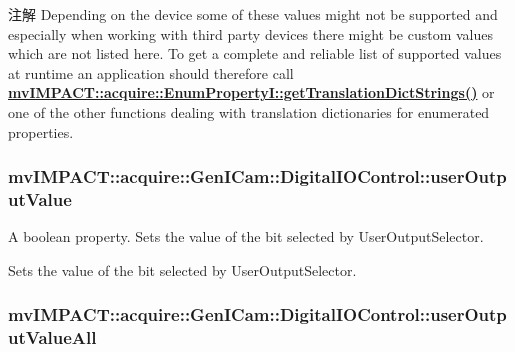 \begin{DoxyNote}{注解}
Depending on the device some of these values might not be supported and especially when working with third party devices there might be custom values which are not listed here. To get a complete and reliable list of supported values at runtime an application should therefore call {\bfseries \hyperlink{classmv_i_m_p_a_c_t_1_1acquire_1_1_enum_property_i_a0ba6ccbf5ee69784d5d0b537924d26b6}{mv\+I\+M\+P\+A\+C\+T\+::acquire\+::\+Enum\+Property\+I\+::get\+Translation\+Dict\+Strings()}} or one of the other functions dealing with translation dictionaries for enumerated properties. 
\end{DoxyNote}
\hypertarget{classmv_i_m_p_a_c_t_1_1acquire_1_1_gen_i_cam_1_1_digital_i_o_control_a061e414fc5254821a2bd512ae7c7e4af}{
\subsubsection[{user\+Output\+Value}]{ mv\+I\+M\+P\+A\+C\+T\+::acquire\+::\+Gen\+I\+Cam\+::\+Digital\+I\+O\+Control\+::user\+Output\+Value}}\label{classmv_i_m_p_a_c_t_1_1acquire_1_1_gen_i_cam_1_1_digital_i_o_control_a061e414fc5254821a2bd512ae7c7e4af}


A boolean property. Sets the value of the bit selected by User\+Output\+Selector. 

Sets the value of the bit selected by User\+Output\+Selector. \hypertarget{classmv_i_m_p_a_c_t_1_1acquire_1_1_gen_i_cam_1_1_digital_i_o_control_a2b61661cdb50161e17bb472614610506}{
\subsubsection[{user\+Output\+Value\+All}]{ mv\+I\+M\+P\+A\+C\+T\+::acquire\+::\+Gen\+I\+Cam\+::\+Digital\+I\+O\+Control\+::user\+Output\+Value\+All}}\label{classmv_i_m_p_a_c_t_1_1acquire_1_1_gen_i_cam_1_1_digital_i_o_control_a2b61661cdb50161e17bb472614610506}


